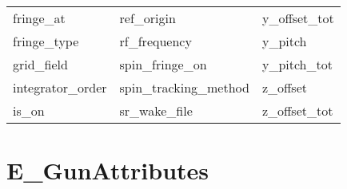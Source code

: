 \begin{tabular}{lll}
fringe_at                   & ref_origin                  & y_offset_tot                \\
fringe_type                 & rf_frequency                & y_pitch                     \\
grid_field                  & spin_fringe_on              & y_pitch_tot                 \\
integrator_order            & spin_tracking_method        & z_offset                    \\
is_on                       & sr_wake_file                & z_offset_tot                \\
 \bottomrule
 \end{tabular}
 \vfill
 
 \section{E_GunAttributes}
 \label{s:list.e.gun}
 
